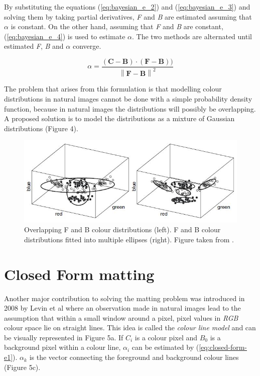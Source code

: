 By substituting the equations (\ref{eq:bayesian_e_2}) and (\ref{eq:bayesian_e_3}) and solving them by taking partial derivatives,\textit{ F} and \textit{B} are estimated assuming that $\alpha$ is constant. On the other hand, assuming that \textit{F} and \textit{B} are constant, (\ref{eq:bayesian_e_4}) is used to estimate $\alpha$. The two methods are alternated until estimated \textit{F}, \textit{B} and $\alpha$ converge.

\begin{equation} \label{eq:bayesian_e_4}
\alpha =\frac{(\textbf{C}-\textbf{B})\cdot (\textbf{F}-\textbf{B}))}{\left \| \textbf{F}-\textbf{B} \right \|^{2}}
\end{equation}

The problem that arises from this formulation is that modelling colour distributions in natural images cannot be done with a simple probability density function, because in natural images the distributions will possibly be overlapping. A proposed solution is to model the distributions as a mixture of Gaussian distributions (Figure 4).

\begin{figure}[t!]
\centering
\includegraphics[width=0.8\columnwidth]{Chapter2/2/bayesian_figure_3.jpg}
\caption[Overlapping distributions.]{Overlapping F and B colour distributions (left). F and B colour distributions fitted into multiple ellipses (right). Figure taken from \cite{visualeffects}.}
\label{fig:bayesian_figure_3}
\end{figure}

\section{Closed Form matting}
\label{sec:closed-form-matting}

Another major contribution to solving the matting problem was introduced in 2008 by Levin et al \cite{closedform} where an observation made in natural images lead to the assumption that within a small window around a pixel, pixel values in \textit{RGB} colour space lie on straight lines. This idea is called the \textit{colour line model} and can be visually represented in Figure 5a. If \textit{$C_{i}$} is a colour pixel and \textit{$B_{0}$} is a background pixel within a colour line, $\alpha_{i}$ can be estimated by (\ref{eq:closed-form-e1}). $\alpha_{k}$ is the vector connecting the foreground and background colour lines (Figure 5c).

